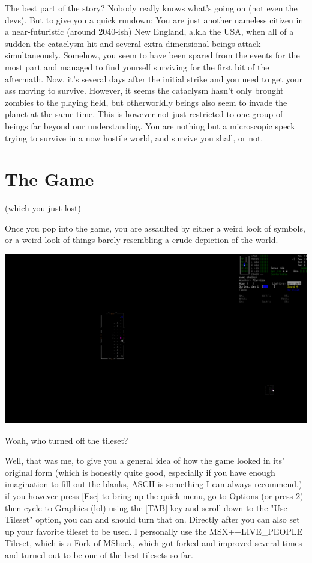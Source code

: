 \documentclass[11pt]{report}
\begin{document}
The best part of the story? Nobody really knows what's going on (not even the devs). But to give you a quick rundown: You are just another nameless citizen in a near-futuristic (around 2040-ish) New England, a.k.a the USA, when all of a sudden the cataclysm hit and several extra-dimensional beings attack simultaneously. Somehow, you seem to have been spared from the events for the most part and managed to find yourself surviving for the first bit of the aftermath. Now, it's several days after the initial strike and you need to get your ass moving to survive. However, it seems the cataclysm hasn't only brought zombies to the playing field, but otherworldly beings also seem to invade the planet at the same time. This is however not just restricted to one group of beings far beyond our understanding. You are nothing but a microscopic speck trying to survive in a now hostile world, and survive you shall, or not.

\chapter{The Game}
(which you just lost)

Once you pop into the game, you are assaulted by either a weird look of symbols, or a weird look of things barely resembling a crude depiction of the world.

\includegraphics[width=\textwidth]{03}

Woah, who turned off the tileset?

Well, that was me, to give you a general idea of how the game looked in its' original form (which is honestly quite good, especially if you have enough imagination to fill out the blanks, ASCII is something I can always recommend.) if you however press [Esc] to bring up the quick menu, go to Options (or press 2) then cycle to Graphics (lol) using the [TAB] key and scroll down to the "Use Tileset" option, you can and should turn that on. Directly after you can also set up your favorite tileset to be used. I personally use the MSX++LIVE\_PEOPLE Tileset, which is a Fork of MShock, which got forked and improved several times and turned out to be one of the best tilesets so far.
\end{document}
